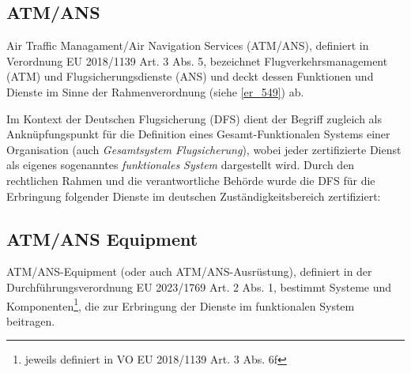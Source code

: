 \subsection{ATM/ANS}

Air Traffic Managament/Air Navigation Services (ATM/ANS), definiert in Verordnung EU 2018/1139 Art. 3 Abs. 5, bezeichnet Flugverkehrsmanagement (ATM) und Flugsicherungsdienste (ANS) und deckt dessen Funktionen und Dienste im Sinne der Rahmenverordnung (siehe \ref{er_549}) ab.


Im Kontext der Deutschen Flugsicherung (DFS) dient der Begriff zugleich als Anknüpfungspunkt für die Definition eines Gesamt-Funktionalen Systems einer Organisation (auch \textit{Gesamtsystem Flugsicherung}), wobei jeder zertifizierte Dienst als eigenes sogenanntes \textit{funktionales System} dargestellt wird.
Durch den rechtlichen Rahmen und die verantwortliche Behörde wurde die DFS für die Erbringung folgender Dienste im deutschen Zuständigkeitsbereich zertifiziert: \cite[17]{ba_technik}

\subsection{ATM/ANS Equipment}

ATM/ANS-Equipment (oder auch ATM/ANS-Ausrüstung), definiert in der Durchführungsverordnung EU 2023/1769 Art. 2 Abs. 1, bestimmt Systeme und Komponenten\footnote{jeweils definiert in VO EU 2018/1139 Art. 3 Abs. 6f}, die zur Erbringung der Dienste im funktionalen System beitragen.